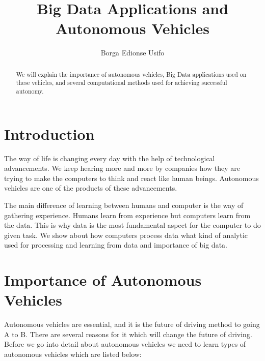 \documentclass[sigconf]{acmart}
\begin{document}
\title{Big Data Applications and Autonomous Vehicles}

\author{Borga Edionse Usifo}

\renewcommand{\shortauthors}{B. Usifo et al.}

\begin{abstract}
We will explain the importance of autonomous vehicles, Big Data applications used on these vehicles, and several computational methods used for achieving successful autonomy. 
\end{abstract}


\maketitle


\section{Introduction}
The way of life is changing every day with the help of technological advancements. We keep hearing more and more by companies how they are trying to make the computers to think and react like human beings. Autonomous vehicles are one of the products of these advancements. 
\par The main difference of learning between humans and computer is the way of gathering experience. Humans learn from experience but computers learn from the data. This is why data is the most fundamental aspect for the computer to do given task. We show about how computers process data what kind of analytic used for processing and learning from data and importance of big data.    

\section{Importance of Autonomous Vehicles}

Autonomous vehicles are essential, and it is the future of driving method to going A to B. There are several reasons for it which will change the future of driving. Before we go into detail about autonomous vehicles we need to learn types of autonomous vehicles which are listed below: 
\end{document}
